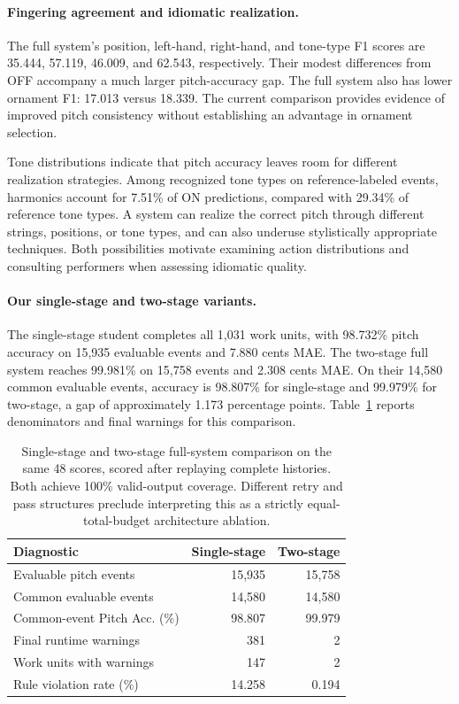 \paragraph{Fingering agreement and idiomatic realization.}
The full system's position, left-hand, right-hand, and tone-type F1 scores are 35.444, 57.119, 46.009, and 62.543, respectively. Their modest differences from OFF accompany a much larger pitch-accuracy gap. The full system also has lower ornament F1: 17.013 versus 18.339. The current comparison provides evidence of improved pitch consistency without establishing an advantage in ornament selection.

Tone distributions indicate that pitch accuracy leaves room for different realization strategies. Among recognized tone types on reference-labeled events, harmonics account for 7.51\% of ON predictions, compared with 29.34\% of reference tone types. A system can realize the correct pitch through different strings, positions, or tone types, and can also underuse stylistically appropriate techniques. Both possibilities motivate examining action distributions and consulting performers when assessing idiomatic quality.

\paragraph{Our single-stage and two-stage variants.}
The single-stage student completes all 1,031 work units, with 98.732\% pitch accuracy on 15,935 evaluable events and 7.880 cents MAE. The two-stage full system reaches 99.981\% on 15,758 events and 2.308 cents MAE. On their 14,580 common evaluable events, accuracy is 98.807\% for single-stage and 99.979\% for two-stage, a gap of approximately 1.173 percentage points. Table~\ref{tab:stage-comparison} reports denominators and final warnings for this comparison.

\begin{table}[t]
\centering\small
\setlength{\tabcolsep}{4pt}
\begin{tabularx}{\linewidth}{@{}Xrr@{}}
\toprule
Diagnostic & Single-stage & Two-stage \\
\midrule
Evaluable pitch events & 15,935 & 15,758 \\
Common evaluable events & 14,580 & 14,580 \\
Common-event Pitch Acc. (\%) & 98.807 & 99.979 \\
Final runtime warnings & 381 & 2 \\
Work units with warnings & 147 & 2 \\
Rule violation rate (\%) & 14.258 & 0.194 \\
\bottomrule
\end{tabularx}
\caption{Single-stage and two-stage full-system comparison on the same 48 scores, scored after replaying complete histories. Both achieve 100\% valid-output coverage. Different retry and pass structures preclude interpreting this as a strictly equal-total-budget architecture ablation.}
\label{tab:stage-comparison}
\end{table}


